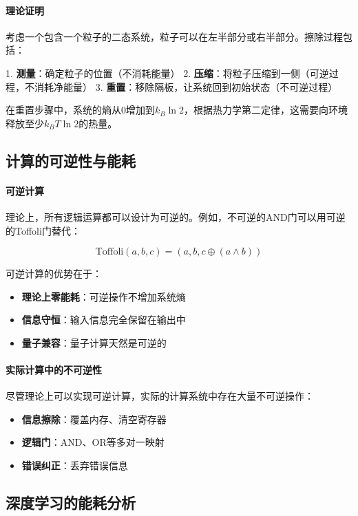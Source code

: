 \paragraph{理论证明}
考虑一个包含一个粒子的二态系统，粒子可以在左半部分或右半部分。擦除过程包括：

1. \textbf{测量}：确定粒子的位置（不消耗能量）
2. \textbf{压缩}：将粒子压缩到一侧（可逆过程，不消耗净能量）
3. \textbf{重置}：移除隔板，让系统回到初始状态（不可逆过程）

在重置步骤中，系统的熵从0增加到$k_B \ln 2$，根据热力学第二定律，这需要向环境释放至少$k_B T \ln 2$的热量。

\subsection{计算的可逆性与能耗}

\paragraph{可逆计算}
理论上，所有逻辑运算都可以设计为可逆的。例如，不可逆的AND门可以用可逆的Toffoli门替代：

$$\text{Toffoli}(a,b,c) = (a, b, c \oplus (a \land b))$$

可逆计算的优势在于：
\begin{itemize}
\item \textbf{理论上零能耗}：可逆操作不增加系统熵
\item \textbf{信息守恒}：输入信息完全保留在输出中
\item \textbf{量子兼容}：量子计算天然是可逆的
\end{itemize}

\paragraph{实际计算中的不可逆性}
尽管理论上可以实现可逆计算，实际的计算系统中存在大量不可逆操作：

\begin{itemize}
\item \textbf{信息擦除}：覆盖内存、清空寄存器
\item \textbf{逻辑门}：AND、OR等多对一映射
\item \textbf{错误纠正}：丢弃错误信息
\end{itemize}

\subsection{深度学习的能耗分析}

